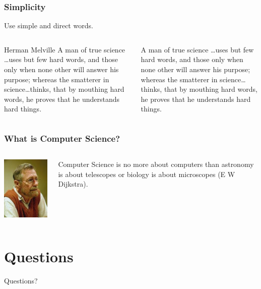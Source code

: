 \documentclass[11pt]{beamer}
\begin{document}
\begin{frame}
  \frametitle{Simplicity}
  Use simple and direct words.
  \begin{columns}
    \begin{column}{.45\textwidth}
      \begin{block}{Herman Melville}
        A man of true science \ldots uses but few hard words,
        and those only when none other will answer his purpose;
        whereas the smatterer in science\ldots thinks, that by
        mouthing hard words, he proves that he understands hard
        things.
      \end{block}
    \end{column}
    \begin{column}{.45\textwidth}
        A man of true science \ldots uses but few hard words,
        and those only when none other will answer his purpose;
        whereas the smatterer in science\ldots thinks, that by
        mouthing hard words, he proves that he understands hard
        things.
    \end{column}
  \end{columns}
\end{frame}

\begin{frame}
  \frametitle{What is Computer Science?}
  \begin{columns}
    \begin{column}{.5\textwidth}
    \begin{center}
      \includegraphics[scale=.5]{dijkstra.jpeg}
    \end{center}      
    \end{column}
    \begin{column}{.5\textwidth}
      \begin{exampleblock}{}
        Computer Science is no more about computers than
        astronomy is about telescopes or biology is about
        microscopes (E W Dijkstra).
      \end{exampleblock}
    \end{column}
  \end{columns}
\end{frame}

\section{Questions}
\begin{frame}{}
  \vfill
  \begin{center}
    Questions?
  \end{center}
  \vfill
  
\end{frame}
\end{document}
